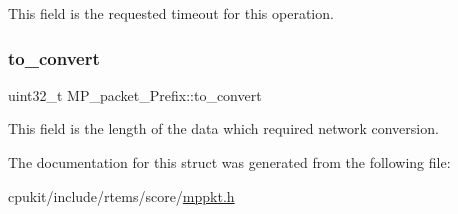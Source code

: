 This field is the requested timeout for this operation. \mbox{\label{structMP__packet__Prefix_ab29ed1964f9a59cae1760e68640e152a}} 
\subsubsection{\texorpdfstring{to\_convert}{to\_convert}}
{\footnotesize\ttfamily uint32\+\_\+t M\+P\+\_\+packet\+\_\+\+Prefix\+::to\+\_\+convert}

This field is the length of the data which required network conversion. 

The documentation for this struct was generated from the following file\+:\begin{DoxyCompactItemize}
\item 
cpukit/include/rtems/score/\mbox{\hyperlink{mppkt_8h}{mppkt.\+h}}\end{DoxyCompactItemize}
